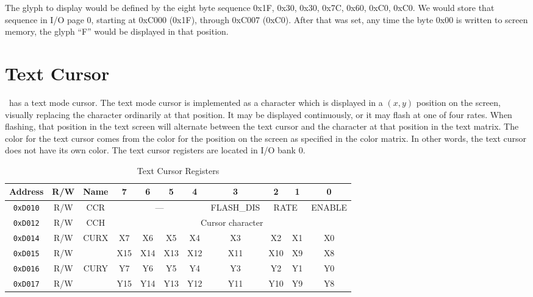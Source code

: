 The glyph to display would be defined by the eight byte sequence 0x1F, 0x30, 0x30, 0x7C, 0x60, 0xC0, 0xC0. We would store that sequence in I/O page 0, starting at 0xC000 (0x1F), through 0xC007 (0xC0). After that was set, any time the byte 0x00 is written to screen memory, the glyph ``F'' would be displayed in that position.

\section*{Text Cursor}

\jr\ has a text mode cursor. The text mode cursor is implemented as a character which is displayed in a $(x, y)$ position on the screen, visually replacing the character ordinarily at that position. It may be displayed continuously, or it may flash at one of four rates. When flashing, that position in the text screen will alternate between the text cursor and the character at that position in the text matrix. The color for the text cursor comes from the color for the position on the screen as specified in the color matrix. In other words, the text cursor does not have its own color. The text cursor registers are located in I/O bank 0.

\begin{table}[ht]
    \begin{center}
        \begin{tabular}{|c|c|c|c|c|c|c|c|c|c|c|} \hline
            Address & R/W & Name & 7 & 6 & 5 & 4 & 3 & 2 & 1 & 0 \\\hline\hline
            \verb+0xD010+ & R/W & CCR & \multicolumn{4}{|c|}{---} & FLASH\_DIS & \multicolumn{2}{|c|}{RATE} & ENABLE \\ \hline
            \verb+0xD012+ & R/W & CCH & \multicolumn{8}{|c|}{Cursor character} \\ \hline
            \verb+0xD014+ & R/W & \multirow{2}{*}{CURX} & X7 & X6 & X5 & X4 & X3 & X2 & X1 & X0 \\ \cline{1-2}\cline{4-11}
            \verb+0xD015+ & R/W &  & X15 & X14 & X13 & X12 & X11 & X10 & X9 & X8 \\ \hline
            \verb+0xD016+ & R/W & \multirow{2}{*}{CURY} & Y7 & Y6 & Y5 & Y4 & Y3 & Y2 & Y1 & Y0 \\ \cline{1-2}\cline{4-11}
            \verb+0xD017+ & R/W &  & Y15 & Y14 & Y13 & Y12 & Y11 & Y10 & Y9 & Y8 \\ \hline
        \end{tabular}
    \end{center}
    \caption{Text Cursor Registers}
    \label{tab:txt_crsr_reg}
\end{table}

